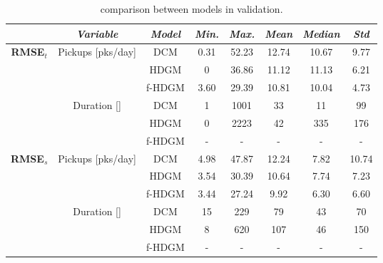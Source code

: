 \begin{table}[h!]
	\centering
	\renewcommand\arraystretch{1.3}
	\begin{tabular}{c|c|c|c|c|c|c|c}
		\hline
		\textit{} & \textit{Variable} & \textit{Model} & \textit{Min.} & \textit{Max.} & \textit{Mean} & \textit{Median} & \textit{Std}\\
		\hline
		\multirow{6}{4em}{\textbf{RMSE$_t$}} & \multirow{3}{4em}{Pickups [pks/day]} & DCM & \num{0.31} & \num{52.23} & \num{12.74} & \num{10.67} & \num{9.77} \\ \cline{3-8}
		& & HDGM & \num{0} & \num{36.86} & \num{11.12} & \num{11.13} & \num{6.21} \\ \cline{3-8}
		& & f-HDGM & \num{3.60} & \num{29.39} & \num{10.81} & \num{10.04} & \num{4.73} \\ \cline{2-8}
		& \multirow{3}{4em}{Duration [\si{\min}]} & DCM & \num{1} & \num{1001} & \num{33} & \num{11} & \num{99} \\ \cline{3-8} 
		& & HDGM & \num{0} & \num{2223} & \num{42} & \num{335} & \num{176} \\ \cline{3-8}
		& & f-HDGM & - & - & - & - & - \\
		\hline
		\multirow{6}{4em}{\textbf{RMSE$_s$}} & \multirow{3}{4em}{Pickups [pks/day]} & DCM & \num{4.98} & \num{47.87} & \num{12.24} & \num{7.82} & \num{10.74} \\ \cline{3-8}
		& & HDGM & \num{3.54} & \num{30.39} & \num{10.64} & \num{7.74} & \num{7.23} \\ \cline{3-8}
		& & f-HDGM & \num{3.44} & \num{27.24} & \num{9.92} & \num{6.30} & \num{6.60} \\ \cline{2-8}
		& \multirow{3}{4em}{Duration [\si{\min}]} & DCM & \num{15} & \num{229} & \num{79} & \num{43} & \num{70} \\ \cline{3-8} 
		& & HDGM & \num{8} & \num{620} & \num{107} & \num{46} & \num{150} \\ \cline{3-8}
		& & f-HDGM & - & - & - & - & - \\
		\hline
	\end{tabular}
	\caption[Comparison between models in validation]{comparison between models in validation.}
	\label{RMSE_final_comp}
\end{table}


